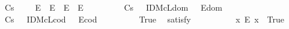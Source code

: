 \begin{isabellebody}
\ \ \ Cs\ {\isacharcolon}\ {\isachardoublequoteopen}\isactrlbold {\isasymforall}{\isasymgamma}\ {\isasymbeta}\ {\isasymalpha}{\isachardot}\ {\isacharparenleft}E{\isacharparenleft}{\isasymgamma}{\isasymcdot}{\isasymbeta}{\isacharparenright}\ \isactrlbold {\isasymand}\ E{\isacharparenleft}{\isasymbeta}{\isasymcdot}{\isasymalpha}{\isacharparenright}{\isacharparenright}\ \isactrlbold {\isasymrightarrow}\ {\isacharparenleft}E{\isacharparenleft}{\isacharparenleft}{\isasymgamma}{\isasymcdot}{\isasymbeta}{\isacharparenright}{\isasymcdot}{\isasymalpha}{\isacharparenright}\ \isactrlbold {\isasymand}\ E{\isacharparenleft}{\isasymgamma}{\isasymcdot}{\isacharparenleft}{\isasymbeta}{\isasymcdot}{\isasymalpha}{\isacharparenright}{\isacharparenright}\ \isactrlbold {\isasymand}\ {\isacharparenleft}{\isacharparenleft}{\isasymgamma}{\isasymcdot}{\isasymbeta}{\isacharparenright}{\isasymcdot}{\isasymalpha}{\isacharparenright}\ {\isacharequal}\ {\isacharparenleft}{\isasymgamma}{\isasymcdot}{\isacharparenleft}{\isasymbeta}{\isasymcdot}{\isasymalpha}{\isacharparenright}{\isacharparenright}{\isacharparenright}{\isachardoublequoteclose}\ \ \isanewline
\ \ \ Cs\ {\isacharcolon}\ {\isachardoublequoteopen}\isactrlbold {\isasymforall}{\isasymgamma}{\isachardot}\ IDMcL{\isacharparenleft}dom\ {\isasymgamma}{\isacharparenright}\ \isactrlbold {\isasymand}\ E{\isacharparenleft}{\isasymgamma}{\isasymcdot}{\isacharparenleft}dom\ {\isasymgamma}{\isacharparenright}{\isacharparenright}{\isachardoublequoteclose}\ \isanewline
\ \ \ Cs\ {\isacharcolon}\ {\isachardoublequoteopen}\isactrlbold {\isasymforall}{\isasymgamma}{\isachardot}\ IDMcL{\isacharparenleft}cod\ {\isasymgamma}{\isacharparenright}\ \isactrlbold {\isasymand}\ E{\isacharparenleft}{\isacharparenleft}cod\ {\isasymgamma}{\isacharparenright}{\isasymcdot}{\isasymgamma}{\isacharparenright}{\isachardoublequoteclose}\ \isanewline
\ \ \isanewline
\ \ \ \isamarkupfalse%
\ True\ \isamarkupfalse%
\ {\isacharbrackleft}satisfy{\isacharbrackright}%
\isadelimproof
\ %
\endisadelimproof
%
\isatagproof
{}\isamarkupfalse%
\ \ %
%
\endisatagproof
{\isafoldproof}%
%
\isadelimproof
%
\endisadelimproof
\isanewline
\ \ \ \isamarkupfalse%
\ \ {\isachardoublequoteopen}{\isasymexists}x{\isachardot}\ \isactrlbold {\isasymnot}{\isacharparenleft}E\ x{\isacharparenright}{\isachardoublequoteclose}\ \ True\ \isamarkupfalse%

\end{isabellebody}
